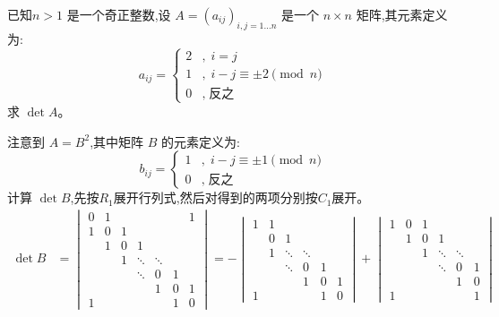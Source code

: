 \begin{questions}
    \question 已知$n > 1$ 是一个奇正整数,设 $A = (a_{ij})_{i,j=1\dots n}$ 是一个 $n \times n$ 矩阵,其元素定义为:
    \[
    a_{ij} = 
    \begin{cases} 
    2 & ,\;i = j \\ 
    1 & ,\;i - j \equiv \pm 2 \pmod n \\ 
    0 & ,\;\text{反之} 
    \end{cases}
    \]
    求 $\det A$。
    \begin{solution}
        注意到 $A = B^2$,其中矩阵 $B$ 的元素定义为:
        \[
        b_{ij} = 
        \begin{cases} 
        1 & ,\;i - j \equiv \pm 1 \pmod n \\ 
        0 & ,\;\text{反之} 
        \end{cases}
        \]
        计算 $\det B$,先按$R_1$展开行列式,然后对得到的两项分别按$C_1$展开。
        \begin{align*}
        \det B &= 
        \begin{vmatrix} 
        0 & 1 & & & & & 1 \\ 
        1 & 0 & 1 & & & \\ 
        & 1 & 0 & 1 & & \\ 
        & & 1 & \ddots & \ddots & \\ 
        & & & \ddots & 0 & 1 \\ 
        & & & & 1 & 0 & 1 \\ 
        1 & & & & & 1 & 0 
        \end{vmatrix} 
        = - \begin{vmatrix} 
        1 & 1 & & & & \\ 
        & 0 & 1 & & &  \\ 
        & 1 & \ddots & \ddots & & \\ 
        & & \ddots & 0 & 1 & \\ 
        & & & 1 & 0 & 1 \\ 
        1 & & & & 1 & 0 
        \end{vmatrix} 
        + \begin{vmatrix} 
        1 & 0 & 1 & & & \\ 
        & 1 & 0 & 1 & & \\ 
        & & 1 & \ddots & \ddots & \\ 
        & & & \ddots & 0 & 1 \\ 
        & & & & 1 & 0 \\ 
        1 & & & & & 1 
        \end{vmatrix} \\

\end{align*}
\end{solution}
\end{questions}
